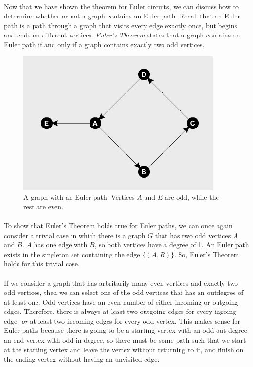 \documentclass{article}
\begin{document}
\paragraph{}
Now that we have shown the theorem for Euler circuits, we can discuss how to determine whether or not a graph contains an Euler path. Recall that an Euler path is a path through a graph that visits every edge exactly once, but begins and ends on different vertices. \textit{Euler's Theorem} states that a graph contains an Euler path if and only if a graph contains exactly two odd vertices.

\begin{figure}[H]
    \centering
    \includegraphics[width=.5\linewidth, height=.3\textheight]{euler_path}
    \caption{A graph with an Euler path. Vertices $A$ and $E$ are odd, while the rest are even.}
\end{figure}

\paragraph{}
To show that Euler's Theorem holds true for Euler paths, we can once again consider a trivial case in which there is a graph $G$ that has two odd vertices $A$ and $B$. $A$ has one edge with $B$, so both vertices have a degree of 1. An Euler path exists in the singleton set containing the edge $\{(A,B)\}$. So, Euler's Theorem holds for this trivial case.

\paragraph{}
If we consider a graph that has arbritarily many even vertices and exactly two odd vertices, then we can select one of the odd vertices that has an outdegree of at least one. Odd vertices have an even number of either incoming or outgoing edges. Therefore, there is always at least two outgoing edges for every ingoing edge, \textit{or} at least two incoming edges for every odd vertex. This makes sense for Euler paths because there is going to be a starting vertex with an odd out-degree an end vertex with odd in-degree, so there must be some path such that we start at the starting vertex and leave the vertex without returning to it, and finish on the ending vertex without having an unvisited edge.
\end{document}
